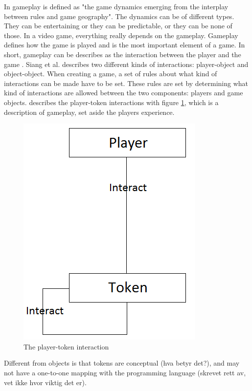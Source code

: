In \cite{understandingvg} gameplay is defined as "the game dynamics emerging from the interplay between rules and game geography". The dynamics can be of different types. They can be entertaining or they can be predictable, or they can be none of those. In a video game, everything really depends on the gameplay. Gameplay defines how the game is played and is the most important element of a game. In short, gameplay can be describes as the interaction between the player and the game \cite{umlapproach}. Siang et al. describes two different kinds of interactions: player-object and object-object. When creating a game, a set of rules about what kind of interactions can be made have to be set. These rules are set by determining what kind of interactions are allowed between the two components: players and game objects. \cite{umlapproach} describes the player-token interactions with figure \ref{fig:playertoken}, which is a description of gameplay, set aside the players experience.
\begin{figure}
\begin{center}
\includegraphics[scale=0.5]{playertoken}
\caption[The player-token interaction]{The player-token interaction \cite{umlapproach}}
\label{fig:playertoken}
\end{center}
\end{figure} 
Different from objects is that tokens are conceptual (hva betyr det?), and may not have a one-to-one mapping with the programming language (skrevet rett av, vet ikke hvor viktig det er).
